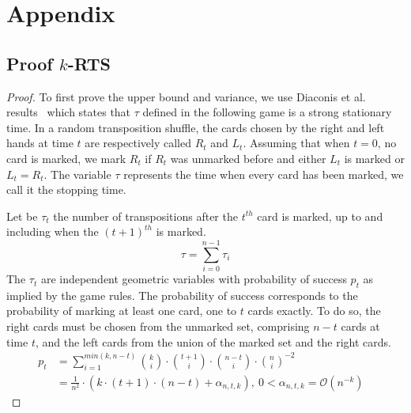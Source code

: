 \documentclass{llncs}
\begin{document}



\section{Appendix}
\subsection{Proof $k$-RTS}\label{proof:kRTS}
\begin{proof}
To first prove the upper bound and variance, we use Diaconis et al. results~\cite{aldous1986shuffling} which states that $\tau$ defined in the following game is a strong stationary time.
In a random transposition shuffle, the cards chosen by the right and left hands at time $t$ are respectively called $R_t$ and $L_t$. Assuming that when $t=0$, no card is marked, we mark $R_t$ if
$R_t$ was unmarked before and either $L_t$ is marked or $L_t = R_t$. The variable $\tau$ represents the time when every card has been marked, we call it the stopping time.

Let be $\tau_t$ the number of transpositions after the $t^{th}$ card is marked, up to and including when the $(t+1)^{th}$ is marked. $$\tau = \sum_{i=0}^{n-1} \tau_i$$
The $\tau_t$ are independent geometric variables with probability of success $p_t$ as implied by the game rules.
The probability of success corresponds to the probability of marking at least one card, one to $t$ cards exactly. To do so, the right cards must be chosen from the unmarked set, comprising $n-t$ cards at time $t$,
and the left cards from the union of the marked set and the right cards.
\begin{align*}
 p_t &= \sum_{i=1}^{min(k,n-t)} {k \choose i} \cdot {t+1 \choose i} \cdot {n-t \choose i}\cdot{n \choose i}^{-2}&\\
 &= \frac{1}{n^2} \cdot \left ( k \cdot (t+1)\cdot(n-t) + \alpha_{n,t,k}\right ),\ 0 < \alpha_{n,t,k} = \mathcal{O}\left(n^{-k}\right )
\end{align*}


\end{proof}
\end{document}
